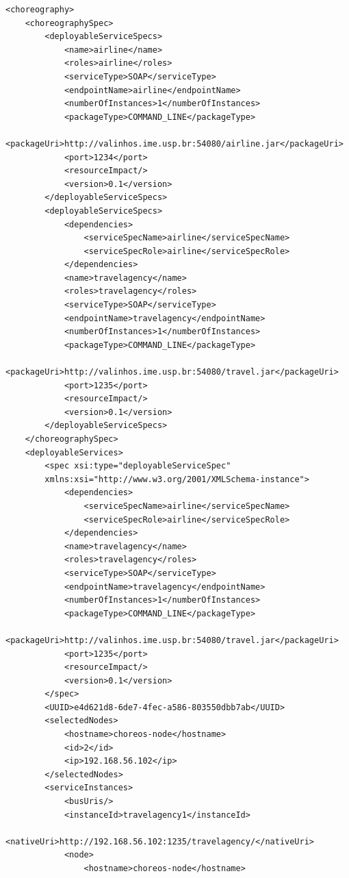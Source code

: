 {\begin{lstlisting}[caption=Choreography XML representation example, label=lst:chor_xml]
<choreography>
    <choreographySpec>
        <deployableServiceSpecs>
            <name>airline</name>
            <roles>airline</roles>
            <serviceType>SOAP</serviceType>
            <endpointName>airline</endpointName>
            <numberOfInstances>1</numberOfInstances>
            <packageType>COMMAND_LINE</packageType>
            <packageUri>http://valinhos.ime.usp.br:54080/airline.jar</packageUri>
            <port>1234</port>
            <resourceImpact/>
            <version>0.1</version>
        </deployableServiceSpecs>
        <deployableServiceSpecs>
            <dependencies>
                <serviceSpecName>airline</serviceSpecName>
                <serviceSpecRole>airline</serviceSpecRole>
            </dependencies>
            <name>travelagency</name>
            <roles>travelagency</roles>
            <serviceType>SOAP</serviceType>
            <endpointName>travelagency</endpointName>
            <numberOfInstances>1</numberOfInstances>
            <packageType>COMMAND_LINE</packageType>
            <packageUri>http://valinhos.ime.usp.br:54080/travel.jar</packageUri>
            <port>1235</port>
            <resourceImpact/>
            <version>0.1</version>
        </deployableServiceSpecs>
    </choreographySpec>
    <deployableServices>
        <spec xsi:type="deployableServiceSpec" 
        xmlns:xsi="http://www.w3.org/2001/XMLSchema-instance">
            <dependencies>
                <serviceSpecName>airline</serviceSpecName>
                <serviceSpecRole>airline</serviceSpecRole>
            </dependencies>
            <name>travelagency</name>
            <roles>travelagency</roles>
            <serviceType>SOAP</serviceType>
            <endpointName>travelagency</endpointName>
            <numberOfInstances>1</numberOfInstances>
            <packageType>COMMAND_LINE</packageType>
            <packageUri>http://valinhos.ime.usp.br:54080/travel.jar</packageUri>
            <port>1235</port>
            <resourceImpact/>
            <version>0.1</version>
        </spec>
        <UUID>e4d621d8-6de7-4fec-a586-803550dbb7ab</UUID>
        <selectedNodes>
            <hostname>choreos-node</hostname>
            <id>2</id>
            <ip>192.168.56.102</ip>
        </selectedNodes>
        <serviceInstances>
            <busUris/>
            <instanceId>travelagency1</instanceId>
            <nativeUri>http://192.168.56.102:1235/travelagency/</nativeUri>
            <node>
                <hostname>choreos-node</hostname>

\end{lstlisting}}
